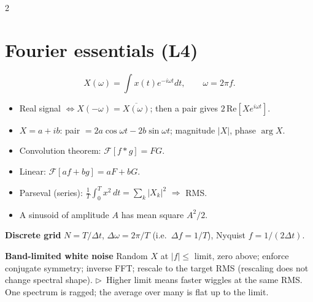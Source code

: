 \documentclass[9pt,letterpaper]{extarticle}
\newcommand{\sub}[1]{\par\vspace{2pt}\textbf{#1}\quad}
\newcommand{\tip}[1]{{\color{BrickRed}\small$\triangleright$~#1}}
\begin{document}
\begin{multicols}{2}
\section{Fourier essentials (L4)}
\[
X(\omega) = \int x(t)e^{-i\omega t}dt,\qquad \omega = 2\pi f.
\]
\begin{itemize}
\item Real signal $\iff X(-\omega) = \overline{X(\omega)}$; then a pair gives $2\,\mathrm{Re}[Xe^{i\omega t}]$.
\item $X = a + ib$: pair $= 2a\cos\omega t - 2b\sin\omega t$; magnitude $|X|$, phase $\arg X$.
\item Convolution theorem: $\mathcal F[f * g] = FG$.
\item Linear: $\mathcal F[af + bg] = aF + bG$.
\item Parseval (series): $\frac1T\int_0^T x^2\,dt = \sum_k |X_k|^2$ $\Rightarrow$ RMS.
\item A sinusoid of amplitude $A$ has mean square $A^2/2$.
\end{itemize}
\sub{Discrete grid} $N = T/\Delta t$, $\Delta\omega = 2\pi/T$ (i.e.\ $\Delta f = 1/T$), Nyquist $f = 1/(2\Delta t)$.
\sub{Band-limited white noise} Random $X$ at $|f| \le$ limit, zero above; enforce conjugate symmetry; inverse FFT; rescale to the target RMS (rescaling does not change spectral shape).
\tip{Higher limit means faster wiggles at the same RMS. One spectrum is ragged; the average over many is flat up to the limit.}


\end{multicols}
\end{document}
